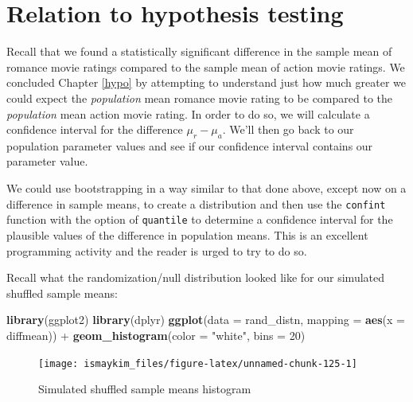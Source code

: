 \documentclass[]{tufte-book}
\newenvironment{Shaded}{\begin{snugshade}}{\end{snugshade}}
\newcommand{\KeywordTok}[1]{\textcolor[rgb]{0.13,0.29,0.53}{\textbf{{#1}}}}
\newcommand{\DataTypeTok}[1]{\textcolor[rgb]{0.13,0.29,0.53}{{#1}}}
\newcommand{\DecValTok}[1]{\textcolor[rgb]{0.00,0.00,0.81}{{#1}}}
\newcommand{\StringTok}[1]{\textcolor[rgb]{0.31,0.60,0.02}{{#1}}}
\newcommand{\NormalTok}[1]{{#1}}
\begin{document}
\section{Relation to hypothesis
testing}\label{relation-to-hypothesis-testing}

Recall that we found a statistically significant difference in the
sample mean of romance movie ratings compared to the sample mean of
action movie ratings. We concluded Chapter \ref{hypo} by attempting to
understand just how much greater we could expect the \emph{population}
mean romance movie rating to be compared to the \emph{population} mean
action movie rating. In order to do so, we will calculate a confidence
interval for the difference \(\mu_r - \mu_a\). We'll then go back to our
population parameter values and see if our confidence interval contains
our parameter value.

We could use bootstrapping in a way similar to that done above, except
now on a difference in sample means, to create a distribution and then
use the \texttt{confint} function with the option of \texttt{quantile}
to determine a confidence interval for the plausible values of the
difference in population means. This is an excellent programming
activity and the reader is urged to try to do so.

Recall what the randomization/null distribution looked like for our
simulated shuffled sample means:

\begin{Shaded}
\begin{Highlighting}[]
\KeywordTok{library}\NormalTok{(ggplot2)}
\KeywordTok{library}\NormalTok{(dplyr)}
\KeywordTok{ggplot}\NormalTok{(}\DataTypeTok{data =} \NormalTok{rand_distn, }\DataTypeTok{mapping =} \KeywordTok{aes}\NormalTok{(}\DataTypeTok{x =} \NormalTok{diffmean)) +}
\StringTok{  }\KeywordTok{geom_histogram}\NormalTok{(}\DataTypeTok{color =} \StringTok{"white"}\NormalTok{, }\DataTypeTok{bins =} \DecValTok{20}\NormalTok{)}
\end{Highlighting}
\end{Shaded}

\begin{figure}

{\centering \texttt{[image: ismaykim\_files/figure-latex/unnamed-chunk-125-1]} 

}

\caption[Simulated shuffled sample means histogram]{Simulated shuffled sample means histogram}\label{fig:unnamed-chunk-125}
\end{figure}
\end{document}
